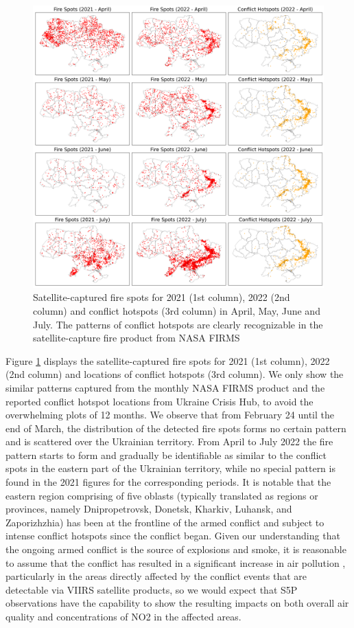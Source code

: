 \begin{figure}[tbh!]
    \centering
    \includegraphics[width=\textwidth]{figs/chap3/fig6.png}
    \caption[Analyzed conflict hotspots using satellite and ACLED data]{Satellite-captured fire spots for 2021 (1st column), 2022 (2nd column) and conflict hotspots (3rd column) in April, May, June and July. The patterns of conflict hotspots are clearly recognizable in the satellite-capture fire product from NASA FIRMS}
    \label{fig:chap3_fig6}
\end{figure}

Figure \ref{fig:chap3_fig6} displays the satellite-captured fire spots for 2021 (1st column), 2022 (2nd column) and locations of conflict hotspots (3rd column). We only show the similar patterns captured from the monthly NASA FIRMS product and the reported conflict hotspot locations from Ukraine Crisis Hub, to avoid the overwhelming plots of 12 months. We observe that from February 24 until the end of March, the distribution of the detected fire spots forms no certain pattern and is scattered over the Ukrainian territory. From April to July 2022 the fire pattern starts to form and gradually be identifiable as similar to the conflict spots in the eastern part of the Ukrainian territory, while no special pattern is found in the 2021 figures for the corresponding periods. It is notable that the eastern region comprising of five oblasts (typically translated as regions or provinces, namely Dnipropetrovsk, Donetsk, Kharkiv, Luhansk, and Zaporizhzhia) has been at the frontline of the armed conflict and subject to intense conflict hotspots since the conflict began. Given our understanding that the ongoing armed conflict is the source of explosions and smoke, it is reasonable to assume that the conflict has resulted in a significant increase in air pollution \citep{pereira2022russian}, particularly in the areas directly affected by the conflict events that are detectable via VIIRS satellite products, so we would expect that S5P observations have the capability to show the resulting impacts on both overall air quality and concentrations of NO2 in the affected areas.\par
